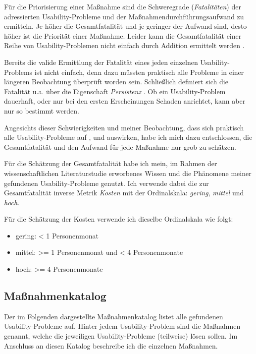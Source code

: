 Für die Priorisierung einer Maßnahme sind die Schweregrade (\textit{Fatalitäten}) der adressierten Usability-Probleme und der Maßnahmendurchführungsaufwand zu ermitteln. Je höher die Gesamtfatalität und je geringer der Aufwand sind, desto höher ist die Priorität einer Maßnahme. Leider kann die Gesamtfatalität einer Reihe von Usability-Problemen nicht einfach durch Addition ermittelt werden \citep{Kahlert:2011wr}.

Bereits die valide Ermittlung der Fatalität eines jeden einzelnen Usability-Problems ist nicht einfach, denn dazu müssten praktisch alle Probleme in einer längeren Beobachtung überprüft worden sein. Schließlich definiert sich die Fatalität u.a. über die Eigenschaft \textit{Persistenz} \citep{Nielsen:1994tx}. Ob ein Usability-Problem dauerhaft, oder nur bei den ersten Erscheinungen Schaden anrichtet, kann aber nur so bestimmt werden.

Angesichts dieser Schwierigkeiten und meiner Beobachtung, dass sich praktisch alle Usability-Probleme auf ,  und  auswirken, habe ich mich dazu entschlossen, die Gesamtfatalität und den Aufwand für jede Maßnahme nur grob zu schätzen.

Für die Schätzung der Gesamtfatalität habe ich mein, im Rahmen der wissenschaftlichen Literaturstudie erworbenes Wissen und die Phänomene meiner gefundenen Usability-Probleme genutzt. Ich verwende dabei die zur Gesamtfatalität inverse Metrik \textit{Kosten} mit der Ordinalskala: \textit{gering}, \textit{mittel} und \textit{hoch}.

Für die Schätzung der Kosten verwende ich dieselbe Ordinalskala wie folgt:
\begin{itemize}\itemsep1pt\parskip0pt
  \item gering: < 1 Personenmonat
  \item mittel: >= 1 Personenmonat und < 4 Personenmonate
  \item hoch: >= 4 Personenmonate
\end{itemize}



\subsection{Maßnahmenkatalog}

Der im Folgenden dargestellte Maßnahmenkatalog listet alle gefundenen Usability-Probleme auf. Hinter jedem Usability-Problem sind die Maßnahmen genannt, welche die jeweiligen Usability-Probleme (teilweise) lösen sollen. Im Anschluss an diesen Katalog beschreibe ich die einzelnen Maßnahmen.

